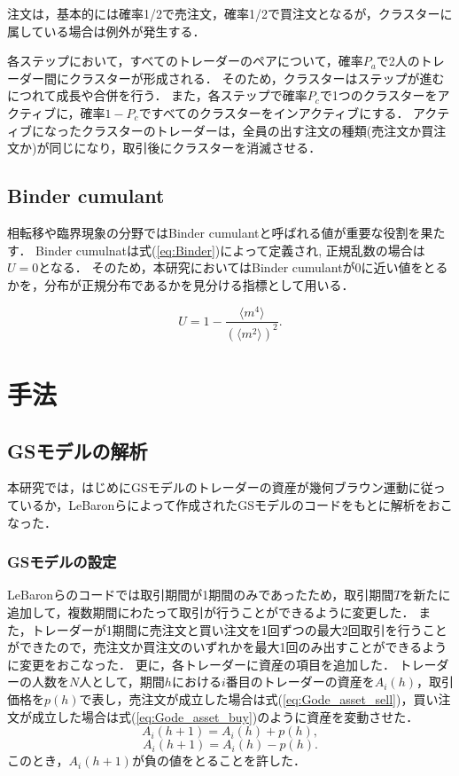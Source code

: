 \documentclass[titlepage]{jsreport}
\begin{document}
注文は，基本的には確率1/2で売注文，確率1/2で買注文となるが，クラスターに属している場合は例外が発生する．

各ステップにおいて，すべてのトレーダーのペアについて，確率$P_a$で2人のトレーダー間にクラスターが形成される．
そのため，クラスターはステップが進むにつれて成長や合併を行う．
また，各ステップで確率$P_c$で1つのクラスターをアクティブに，確率$1 - P_c$ですべてのクラスターをインアクティブにする．
アクティブになったクラスターのトレーダーは，全員の出す注文の種類(売注文か買注文か)が同じになり，取引後にクラスターを消滅させる．

\section{Binder cumulant}
相転移や臨界現象の分野ではBinder cumulantと呼ばれる値が重要な役割を果たす\cite{Binder_cumulant}．
Binder cumulnatは式(\ref{eq:Binder})によって定義され, 正規乱数の場合は$U = 0$となる．
そのため，本研究においてはBinder cumulantが0に近い値をとるかを，分布が正規分布であるかを見分ける指標として用いる．

\begin{equation}
    U = 1 - \frac{\langle m^4 \rangle}{(\langle m^2 \rangle)^2}. \label{eq:Binder}
\end{equation}


\chapter{手法} \label{chap:method}
\section{GSモデルの解析}
本研究では，はじめにGSモデルのトレーダーの資産が幾何ブラウン運動に従っているか，LeBaronらによって作成されたGSモデルのコード\cite{Gode_and_Sunder_code}をもとに解析をおこなった．

\subsection{GSモデルの設定}
LeBaronらのコードでは取引期間が1期間のみであったため，取引期間$T$を新たに追加して，複数期間にわたって取引が行うことができるように変更した．
また，トレーダーが1期間に売注文と買い注文を1回ずつの最大2回取引を行うことができたので，売注文か買注文のいずれかを最大1回のみ出すことができるように変更をおこなった．
更に，各トレーダーに資産の項目を追加した．
トレーダーの人数を$N$人として，期間$h$における$i$番目のトレーダーの資産を$A_i(h)$，取引価格を$p(h)$で表し，売注文が成立した場合は式(\ref{eq:Gode_asset_sell})，買い注文が成立した場合は式(\ref{eq:Gode_asset_buy})のように資産を変動させた．
\begin{equation}
    A_i(h + 1) = A_i(h) + p(h), \label{eq:Gode_asset_sell}
\end{equation}
\begin{equation}
    A_i(h + 1) = A_i(h) - p(h). \label{eq:Gode_asset_buy}
\end{equation}
このとき，$A_i(h + 1)$が負の値をとることを許した．
\end{document}
